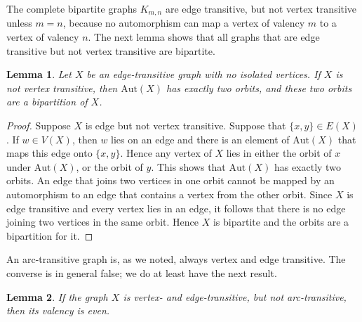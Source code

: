\documentclass[12pt,a4paper,openany]{book}
\newtheorem{lemma}{Lemma}[section]
\begin{document}
The complete bipartite graphs $K_{m,n}$ are edge transitive, but not vertex transitive unless $m = n$, because no automorphism can map a vertex of valency $m$ to a vertex of valency $n$. The next lemma shows that all graphs that are edge transitive but not vertex transitive are bipartite.

\begin{lemma}
Let $X$ be an edge-transitive graph with no isolated vertices. If $X$ is not vertex transitive, then $\text{Aut}(X)$ has exactly two orbits, and these two orbits are a bipartition of $X$.
\end{lemma}

\begin{proof}
Suppose $X$ is edge but not vertex transitive. Suppose that $\{x, y\} \in E(X)$. If $w \in V(X)$, then $w$ lies on an edge and there is an element of $\text{Aut}(X)$ that maps this edge onto $\{x,y\}$. Hence any vertex of $X$ lies in either the orbit of $x$ under $\text{Aut}(X)$, or the orbit of $y$. This shows that $\text{Aut}(X)$ has exactly two orbits. An edge that joins two vertices in one orbit cannot be mapped by an automorphism to an edge that contains a vertex from the other orbit. Since $X$ is edge transitive and every vertex lies in an edge, it follows that there is no edge joining two vertices in the same orbit. Hence $X$ is bipartite and the orbits are a bipartition for it.
\end{proof}



An arc-transitive graph is, as we noted, always vertex and edge transitive. The converse is in general false; we do at least have the next result.

\begin{lemma}
If the graph $X$ is vertex- and edge-transitive, but not arc-transitive, then its valency is even.
\end{lemma}
\end{document}
